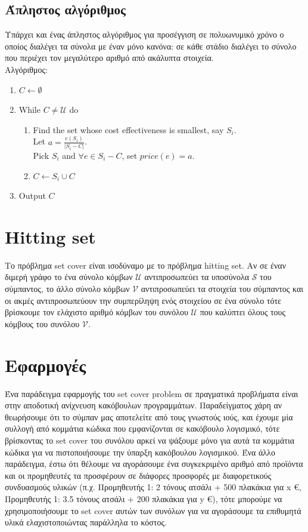 \subsection{Άπληστος αλγόριθμος} 

Υπάρχει και ένας άπληστος αλγόριθμος για προσέγγιση σε πολυωνυμικό χρόνο ο οποίος διαλέγει τα σύνολα με έναν μόνο κανόνα: σε κάθε στάδιο διαλέγει το σύνολο που περιέχει τον μεγαλύτερο αριθμό από ακάλυπτα στοιχεία.\\

Αλγόριθμος:
\begin{enumerate}
\item $ C \leftarrow \emptyset$
\item While $ C \neq {\mathcal{U}} $ do
\begin{enumerate}
\item Find the set whose cost effectiveness is smallest, say $S_i$. \\
			Let $a = \frac{c(S_i)}{|S_i-C|}$. \\
			Pick $S_i$ and $\forall e \in{S_i - C}$, set $price(e) = a$.
\item $C \leftarrow S_i \cup C$
\end{enumerate}
\item Output $C$
\end{enumerate}

\section{Hitting set}
Το πρόβλημα set cover είναι ισοδύναμο με το πρόβλημα hitting set. Αν σε έναν διμερή γράφο το ένα σύνολο κόμβων ${\mathcal{U}}$ αντιπροσωπεύει τα υποσύνολα ${\mathcal{S}}$ του σύμπαντος, το άλλο σύνολο κόμβων ${\mathcal{V}}$ αντιπροσωπεύει τα στοιχεία του σύμπαντος και οι ακμές αντιπροσωπεύουν την συμπερίληψη ενός στοιχείου σε ένα σύνολο τότε βρίσκουμε τον ελάχιστο αριθμό κόμβων του συνόλου ${\mathcal{U}}$ που καλύπτει όλους τους κόμβους του συνόλου ${\mathcal{V}}$.

\section{Εφαρμογές}
Ένα παράδειγμα εφαρμογής του set cover problem σε πραγματικά προβλήματα είναι στην αποδοτική ανίχνευση κακόβουλων προγραμμάτων.  
Παραδείγματος χάρη αν θεωρήσουμε ότι το σύμπαν μας αποτελείτε από τους γνωστούς ιούς, και έχουμε μία συλλογή από κομμάτια κώδικα που εμφανίζονται σε κακόβουλο λογισμικό, 
τότε βρίσκοντας το set cover του συνόλου αρκεί να ψάξουμε μόνο για αυτά τα κομμάτια κώδικα για να πιστοποιήσουμε την ύπαρξη κακόβουλου λογισμικού.
Ένα άλλο παράδειγμα, έστω ότι θέλουμε να αγοράσουμε ένα συγκεκριμένο αριθμό από προϊόντα και οι προμηθευτές τα προσφέρουν σε διάφορες προσφορές με διαφορετικούς συνδυασμούς υλικών (π.χ. Προμηθευτής 1: 2 τόνους ατσάλι + 500 πλακάκια για x \euro, Προμηθευτής 1: 3.5 τόνους ατσάλι + 200 πλακάκια για y \euro), τότε μπορούμε να χρησιμοποιήσουμε το set cover αυτών των συνόλων για να αγοράσουμε τα επιθυμητά υλικά ελαχιστοποιώντας παράλληλα το κόστος.
